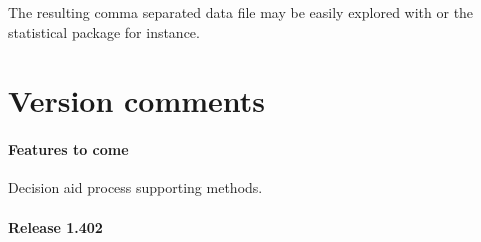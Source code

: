 \documentclass{article}
\newcommand{\+}{\verb+}
\renewcommand{\*}{\back{}}
\begin{document}
\begin{center}
The resulting comma separated data file  may be easily explored with  or the statistical package  for instance.

\section{Version comments}
\label{sec:changes}

\paragraph{Features to come}
\begin{menu}
\item Decision aid process supporting methods.
\end{menu}

\paragraph{Release 1.402}


\end{center}
\end{document}
